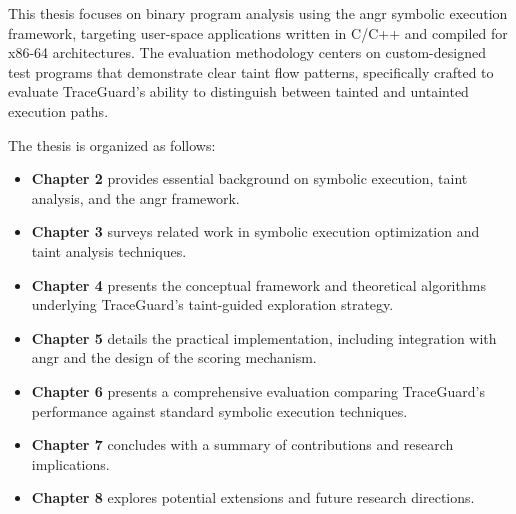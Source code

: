 This thesis focuses on binary program analysis using the angr symbolic execution framework, targeting user-space applications written in C/C++ and compiled for x86-64 architectures. The evaluation methodology centers on custom-designed test programs that demonstrate clear taint flow patterns, specifically crafted to evaluate TraceGuard's ability to distinguish between tainted and untainted execution paths.

The thesis is organized as follows:

\begin{itemize}
    \item \textbf{Chapter 2} provides essential background on symbolic execution, taint analysis, and the angr framework.
    \item \textbf{Chapter 3} surveys related work in symbolic execution optimization and taint analysis techniques.
    \item \textbf{Chapter 4} presents the conceptual framework and theoretical algorithms underlying TraceGuard's taint-guided exploration strategy.
    \item \textbf{Chapter 5} details the practical implementation, including integration with angr and the design of the scoring mechanism.
    \item \textbf{Chapter 6} presents a comprehensive evaluation comparing TraceGuard's performance against standard symbolic execution techniques.
    \item \textbf{Chapter 7} concludes with a summary of contributions and research implications.
    \item \textbf{Chapter 8} explores potential extensions and future research directions.
\end{itemize}
